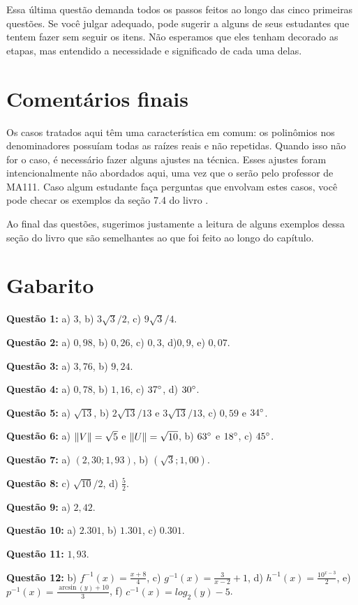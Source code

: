 \documentclass[main_estudante.tex]{subfiles}
\begin{document}
Essa última questão demanda todos os passos feitos ao longo das cinco primeiras questões. Se você julgar adequado, pode sugerir a alguns de seus estudantes que tentem fazer sem seguir os itens. Não esperamos que eles tenham decorado as etapas, mas entendido a necessidade e significado de cada uma delas. 

\section{Comentários finais}

Os casos tratados aqui têm uma característica em comum: os polinômios nos denominadores possuíam todas as raízes reais e não repetidas. Quando isso não for o caso, é necessário fazer alguns ajustes na técnica. Esses ajustes foram intencionalmente não abordados aqui, uma vez que o serão pelo professor de MA111. Caso algum estudante faça perguntas que envolvam estes casos, você pode checar os exemplos da seção 7.4 do livro .

Ao final das questões, sugerimos justamente a leitura de alguns exemplos dessa seção do livro que são semelhantes ao que foi feito ao longo do capítulo.

\section{Gabarito}

\noindent\textbf{Questão 1:} a) $3$, b) $3\sqrt{3}/2$, c) $9\sqrt{3}/4$.

\noindent\textbf{Questão 2:} a) $0,98$, b) $0,26$, c) $0,3$, d)$0,9$, e) $0,07$.

\noindent\textbf{Questão 3:} a) $3,76$, b) $9,24$.

\noindent\textbf{Questão 4:} a) $0,78$, b) $1,16$, c) $37\degree$, d) $30\degree$.

\noindent\textbf{Questão 5:} a) $\sqrt{13}$, b) $2\sqrt{13}/13$ e $3\sqrt{13}/13$, c) $0,59$ e $34\degree$.

\noindent\textbf{Questão 6:} a) $\Arrowvert V \Arrowvert = \sqrt{5}$ e $\Arrowvert U \Arrowvert = \sqrt{10}$, b) $63\degree$ e $18\degree$, c) $45\degree$.

\noindent\textbf{Questão 7:} a) $(2,30;1,93)$, b) $(\sqrt{3};1,00)$.

\noindent\textbf{Questão 8:} c) $\sqrt{10}/2$, d) $\frac{5}{2}$.

\noindent\textbf{Questão 9:} a) $2,42$.

\noindent\textbf{Questão 10:} a) $2.301$, b) $1.301$, c) $0.301$.

\noindent\textbf{Questão 11:} $1,93$.

\noindent\textbf{Questão 12:} b) $f^{-1}(x)=\frac{x+8}{4}$, c) $g^{-1}(x)=\frac{3}{x-2}+1$, d) $h^{-1}(x)=\frac{10^{x-3}}{2}$, e) $p^{-1}(x)=\frac{\arcsin(y)+10}{3}$, f) $c^{-1}(x)=log_2 (y)-5$.
\end{document}
